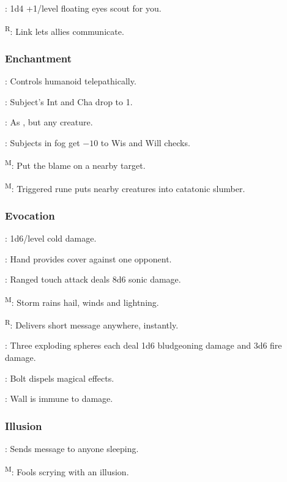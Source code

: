 	: 1d4 +1/level floating eyes scout for you.

	\textsuperscript{R}: Link lets allies communicate.

\subsubsection{Enchantment}
	: Controls humanoid telepathically.

	: Subject's Int and Cha drop to 1.

	: As , but any creature.

	: Subjects in fog get $-10$ to Wis and Will checks.

	\textsuperscript{M}: Put the blame on a nearby target. %

	\textsuperscript{M}: Triggered rune puts nearby creatures into catatonic slumber.

\subsubsection{Evocation}
	
	: 1d6/level cold damage.
	
	: Hand provides cover against one opponent.
	
	: Ranged touch attack deals 8d6 sonic damage. %
	
	\textsuperscript{M}: Storm rains hail, winds and lightning. %
	
	\textsuperscript{R}: Delivers short message anywhere, instantly.

	: Three exploding spheres each deal 1d6 bludgeoning damage and 3d6 fire damage. %
	
	: Bolt dispels magical effects. %
	
	: Wall is immune to damage.

\subsubsection{Illusion}
	: Sends message to anyone sleeping.

	\textsuperscript{M}: Fools scrying with an illusion.

